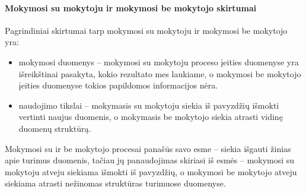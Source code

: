 \paragraph{Mokymosi su mokytoju ir mokymosi be mokytojo skirtumai}

 Pagrindiniai skirtumai tarp mokymosi su mokytoju ir mokymosi be mokytojo yra:
\begin{itemize}
  \item mokymosi duomenys -- mokymosi su mokytoju proceso įeities duomenyse yra išreikštinai pasakyta, kokio rezultato mes laukiame, o mokymosi be mokytojo įeities duomenyse tokios papildomos informacijos nėra.
  \item  naudojimo tikslai -- mokymasis su mokytoju siekia iš pavyzdžių išmokti vertinti naujus duomenis, o mokymasis be mokytojo siekia atrasti vidinę duomenų struktūrą.
\end{itemize}
Mokymosi su ir be mokytojo procesai panašūs savo esme -- siekia išgauti žinias apie turimus duomenis, tačiau jų panaudojimas skiriasi iš esmės -- mokymosi su mokytoju atveju siekiama išmokti iš pavyzdžių, o mokymosi be mokytojo atveju siekiama atrasti nežinomas struktūras turimuose duomenyse.




